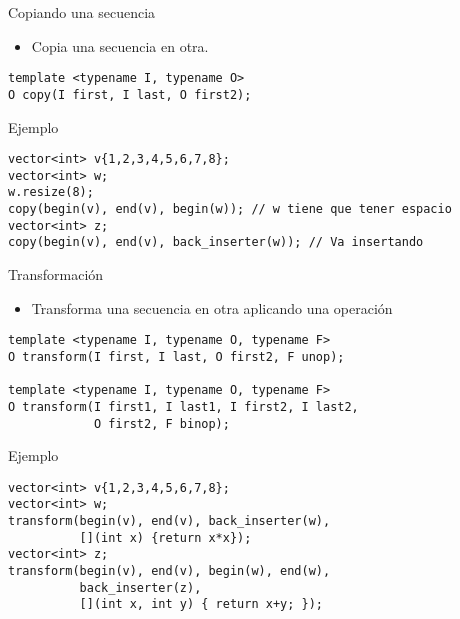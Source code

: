 \begin{frame}[t,fragile]{Copiando una secuencia}
\begin{itemize}
  \item Copia una secuencia en otra.
\end{itemize}
\begin{lstlisting}[]
template <typename I, typename O>
O copy(I first, I last, O first2);
\end{lstlisting}
\begin{block}{Ejemplo}
\begin{lstlisting}[]
vector<int> v{1,2,3,4,5,6,7,8};
vector<int> w;
w.resize(8);
copy(begin(v), end(v), begin(w)); // w tiene que tener espacio
vector<int> z;
copy(begin(v), end(v), back_inserter(w)); // Va insertando
\end{lstlisting}
\end{block}
\end{frame}

\begin{frame}[t,fragile]{Transformación}
\begin{itemize}
  \item Transforma una secuencia en otra aplicando una operación
\end{itemize}
\begin{lstlisting}[]
template <typename I, typename O, typename F>
O transform(I first, I last, O first2, F unop);

template <typename I, typename O, typename F>
O transform(I first1, I last1, I first2, I last2,
            O first2, F binop);
\end{lstlisting}
\begin{block}{Ejemplo}
\begin{lstlisting}[]
vector<int> v{1,2,3,4,5,6,7,8};
vector<int> w;
transform(begin(v), end(v), back_inserter(w),
          [](int x) {return x*x}); 
vector<int> z;
transform(begin(v), end(v), begin(w), end(w),
          back_inserter(z),
          [](int x, int y) { return x+y; });
\end{lstlisting}
\end{block}
\end{frame}
